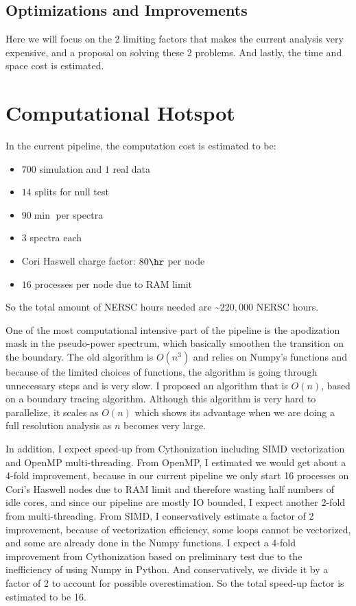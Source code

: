 \documentclass[12pt,english,letterpaper,article]{memoir}
\providecommand{\tightlist}{%
  \setlength{\itemsep}{0pt}\setlength{\parskip}{0pt}}
\begin{document}
\section{Optimizations and
Improvements}\label{optimizations-and-improvements}

Here we will focus on the 2 limiting factors that makes the current
analysis very expensive, and a proposal on solving these 2 problems. And
lastly, the time and space cost is estimated.

\chapter{Computational Hotspot}\label{computational-hotspot}

In the current pipeline, the computation cost is estimated to be:

\begin{itemize}
\tightlist
\item
  \(700\) simulation and \(1\) real data
\item
  \(14\) splits for null test
\item
  \(90 \min\) per spectra
\item
  \(3\) spectra each
\item
  Cori Haswell charge factor: \(80 \hr\) per node
\item
  \(16\) processes per node due to RAM limit
\end{itemize}

So the total amount of NERSC hours needed are \sim \(220,000\) NERSC
hours.

One of the most computational intensive part of the pipeline is the
apodization mask in the pseudo-power spectrum, which basically smoothen
the transition on the boundary. The old algorithm is \(O(n^3)\) and
relies on Numpy's functions and because of the limited choices of
functions, the algorithm is going through unnecessary steps and is very
slow. I proposed an algorithm that is \(O(n)\), based on a boundary
tracing algorithm. Although this algorithm is very hard to parallelize,
it scales as \(O(n)\) which shows its advantage when we are doing a full
resolution analysis as \(n\) becomes very large.

In addition, I expect speed-up from Cythonization including SIMD
vectorization and OpenMP multi-threading. From OpenMP, I estimated we
would get about a 4-fold improvement, because in our current pipeline we
only start 16 processes on Cori's Haswell nodes due to RAM limit and
therefore wasting half numbers of idle cores, and since our pipeline are
mostly IO bounded, I expect another 2-fold from multi-threading. From
SIMD, I conservatively estimate a factor of 2 improvement, because of
vectorization efficiency, some loops cannot be vectorized, and some are
already done in the Numpy functions. I expect a 4-fold improvement from
Cythonization based on preliminary test due to the inefficiency of using
Numpy in Python. And conservatively, we divide it by a factor of 2 to
account for possible overestimation. So the total speed-up factor is
estimated to be 16.
\end{document}
